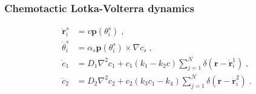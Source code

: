 \documentclass{article}
\begin{document}
\subsubsection{Chemotactic Lotka-Volterra dynamics}
\begin{subequations}
    \begin{align}
        \dot{\mathbf{r}}_{i}^{s}&=v\mathbf{p}\left( \theta _{i}^{s} \right)\;,\\
        \dot{\theta}_{i}^{s}&=\alpha _s\mathbf{p}\left( \theta _{i}^{s} \right) \times \nabla c_s\;,\\
        \dot{c}_1&=D_1\nabla ^2c_1+c_1\left( k_1-k_2c \right) \sum_{j=1}^N{\delta \left( \mathbf{r}-\dot{\mathbf{r}}_{i}^{1} \right)}\;,\\
        \dot{c}_2&=D_2\nabla ^2c_2+c_2\left( k_3c_1-k_4 \right) \sum_{j=1}^N{\delta \left( \mathbf{r}-\dot{\mathbf{r}}_{i}^{2} \right)}\;.
    \end{align}
\end{subequations}
\end{document}
